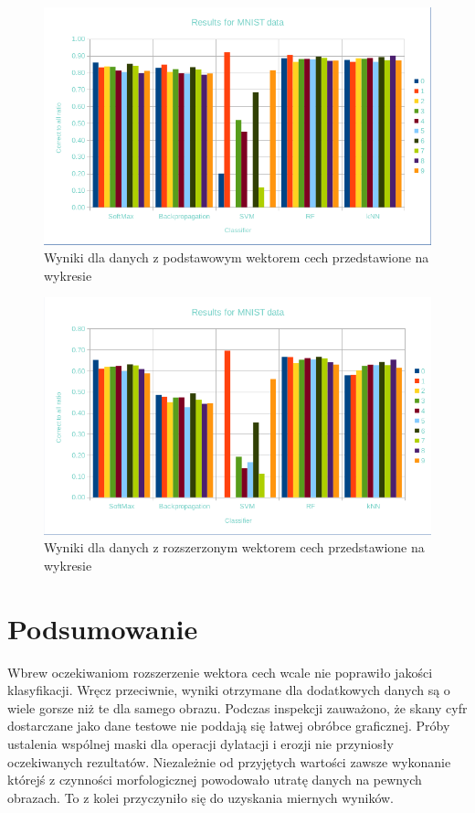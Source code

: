 \documentclass{article}
\begin{document}
\begin{figure}[htp]
	\centering
	\includegraphics[width=1\textwidth]{Figures/basic-vector-summary.png}
	\caption{ Wyniki dla danych z podstawowym wektorem cech przedstawione na wykresie }
	\label{fig:basic-vector-summary}\vspace{-3pt}
\end{figure}

\begin{figure}[htp]
\centering
\includegraphics[width=1\textwidth]{Figures/extended-vector-summary.png}
\caption{ Wyniki dla danych z rozszerzonym wektorem cech przedstawione na wykresie }
\label{fig:extended-vector-summary}\vspace{-3pt}
\end{figure}

\section{Podsumowanie}
Wbrew oczekiwaniom rozszerzenie wektora cech wcale nie poprawiło jakości klasyfikacji. Wręcz przeciwnie, wyniki otrzymane dla dodatkowych danych są o wiele gorsze niż te dla samego obrazu. Podczas inspekcji zauważono, że skany cyfr dostarczane jako dane testowe nie poddają się łatwej obróbce graficznej. Próby ustalenia wspólnej maski dla operacji dylatacji i erozji nie przyniosły oczekiwanych rezultatów. Niezależnie od przyjętych wartości zawsze wykonanie którejś z czynności morfologicznej powodowało utratę danych na pewnych obrazach. To z kolei przyczyniło się do uzyskania miernych wyników. \\
\end{document}
